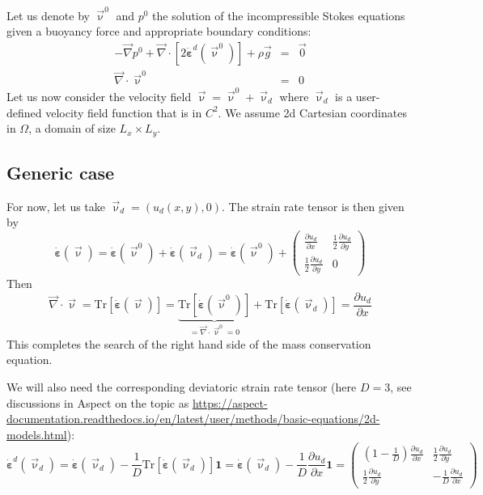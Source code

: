 Let us denote by $\vec{\upnu}^0$ and $p^0$ the solution of the incompressible Stokes equations
given a buoyancy force and appropriate boundary conditions:
\begin{eqnarray}
-\vec\nabla p^0 +\vec\nabla\cdot[2\dot{\bm \varepsilon}^d(\vec\upnu^0)] +\rho\vec{g} &=&\vec{0} \label{eq:dil1} \\
\vec\nabla \cdot \vec\upnu^0 &=& 0
\end{eqnarray}
Let us now consider the velocity field $\vec{\upnu}=\vec{\upnu}^0+\vec{\upnu}_d$
where $\vec{\upnu}_d$ is a user-defined velocity field function that is in $C^2$. 
We assume 2d Cartesian coordinates in $\Omega$, a domain of size $L_x \times L_y$. 






\subsection*{Generic case}

For now, let us take $\vec{\upnu}_d=(u_d(x,y) ,0)$.
The strain rate tensor is then given by 
\[
\dot{\bm \varepsilon}(\vec\upnu)= \dot{\bm \varepsilon}(\vec\upnu^0)
+ \dot{\bm \varepsilon}(\vec\upnu_d)= 
\dot{\bm \varepsilon}(\vec\upnu^0) + 
\begin{pmatrix}
\frac{\partial u_d}{\partial x} & \frac12 \frac{\partial u_d}{\partial y}  \\
\frac12 \frac{\partial u_d}{\partial y}  & 0
\end{pmatrix}
\]
Then 
\[
\vec\nabla \cdot \vec\upnu 
= \text{Tr}[\dot{\bm \varepsilon}(\vec\upnu)]
= \underbrace{\text{Tr}[\dot{\bm \varepsilon}(\vec\upnu^0)]}_{=  \vec\nabla \cdot \vec\upnu^0  =0}
+ \text{Tr}[\dot{\bm \varepsilon}(\vec\upnu_d)]
= \frac{\partial u_d}{\partial x}
\]
This completes the search of the right hand side of the mass conservation equation.

We will also need the corresponding deviatoric strain rate tensor (here $D=3$, 
see discussions in Aspect on the topic
as \url{https://aspect-documentation.readthedocs.io/en/latest/user/methods/basic-equations/2d-models.html}):
\[
\dot{\bm \varepsilon}^d(\vec\upnu_d)
=\dot{\bm \varepsilon}(\vec\upnu_d) - \frac{1}{D} \text{Tr}[\dot{\bm \varepsilon}(\vec\upnu_d)] {\bm 1}
=\dot{\bm \varepsilon}(\vec\upnu_d) - \frac{1}{D} \frac{\partial u_d}{\partial x} {\bm 1}
=
\begin{pmatrix}
(1-\frac1D) \frac{\partial u_d}{\partial x} & \frac12 \frac{\partial u_d}{\partial y}  \\
\frac12 \frac{\partial u_d}{\partial y}  & -\frac1D \frac{\partial u_d}{\partial x}
\end{pmatrix}
\]

